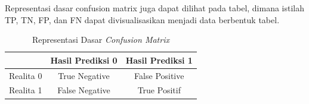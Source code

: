 Representasi dasar confusion matrix juga dapat dilihat pada tabel, dimana istilah TP, TN, FP, dan FN dapat divisualisasikan menjadi data berbentuk tabel.

\begin{longtable}{|c|c|c|}
  \caption{Representasi Dasar \emph{Confusion Matrix}}
  \label{tb:Representasi Dasar Confusion Matrix}\\
  \hline
  \textbf{} & \textbf{Hasil Prediksi 0} & \textbf{Hasil Prediksi 1} \\
  \hline
  Realita 0   &  True Negative    & False Positive  \\
  Realita 1   &  False Negative   & True Positif  \\
  \hline
\end{longtable}


